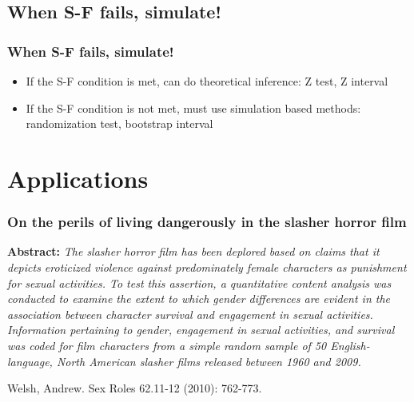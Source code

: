 \documentclass[11pt,containsverbatim,handout,xcolor=xelatex,dvipsnames,table]{beamer}
\begin{document}

\subsection{When S-F fails, simulate!}
\label{mi3}


\begin{frame}
\frametitle{When S-F fails, simulate!}

\begin{itemize}

\item If the S-F condition is met, can do theoretical inference: Z test, Z interval

\item If the S-F condition is not met, must use simulation based methods: randomization test, bootstrap interval

\end{itemize}

\end{frame}


\section{Applications}


\begin{frame}
\frametitle{On the perils of living dangerously in the slasher horror film}

{\small \textbf{Abstract:} \textit{The slasher horror film has been deplored based on claims that it depicts eroticized 
violence against predominately female characters as punishment for sexual activities. To test this assertion, a 
quantitative content analysis was conducted to examine the extent to which gender differences are evident in the 
association between character survival and engagement in sexual activities. Information pertaining to gender, 
engagement in sexual activities, and survival was coded for film characters from a simple random sample of 50 
English-language, North American slasher films released between 1960 and 2009.}}

\vfill

{\scriptsize Welsh, Andrew.  
Sex Roles 62.11-12 (2010): 762-773.}

\end{frame}
\end{document}
